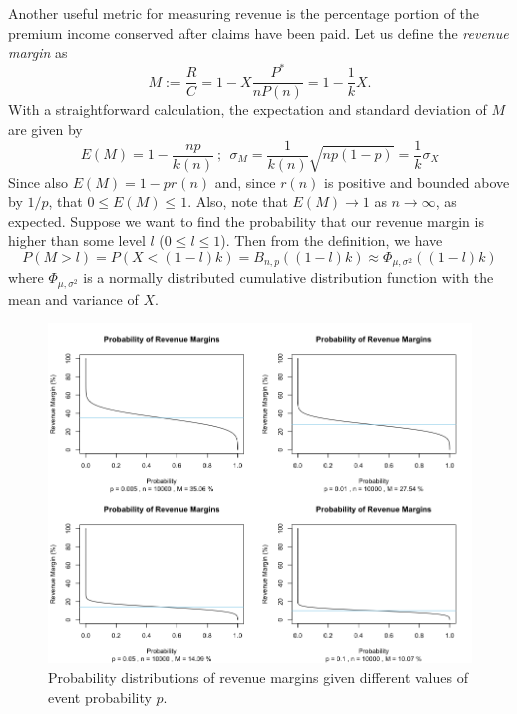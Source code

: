 \documentclass[12pt]{article}
\begin{document}
Another useful metric for measuring revenue is the percentage portion of the premium income conserved after claims have been paid. Let us define the \textit{revenue margin} as
\begin{equation*}
    M := \frac{R}{C} = 1 - X\frac{P^*}{nP(n)} = 1-\frac{1}{k}X.
\end{equation*}
With a straightforward calculation, the expectation and standard deviation of $M$ are given by
\begin{equation}
  \label{revmargin}
  E(M) = 1-\frac{np}{k(n)}\ ;\ \ \sigma_M = \frac{1}{k(n)}\sqrt{np(1-p)} = \frac{1}{k}\sigma_X
\end{equation}
Since also $E(M) = 1-pr(n)$ and, since $r(n)$ is positive and bounded above by $1/p$, that $0\leq E(M)\leq 1$. Also, note that $E(M)\to 1$ as $n\to\infty$, as expected. Suppose we want to find the probability that our revenue margin is higher than some level $l$ ($0\leq l\leq 1$). Then from the definition, we have
\begin{equation}
    P(M > l) = P\left(X <(1-l)k\right) = B_{n,p}((1-l)k) \approx \Phi_{\mu,\sigma^2}\left((1-l)k\right)
\end{equation}
where $\Phi_{\mu,\sigma^2}$ is a normally distributed cumulative distribution function with the mean and variance of $X$.

\begin{figure}[H]
    \begin{center}
        \includegraphics[scale=.5]{margins}
    \end{center}
    \caption{\footnotesize Probability distributions of revenue margins given different values of event probability $p$.}\label{fig1}
\end{figure}
\end{document}
